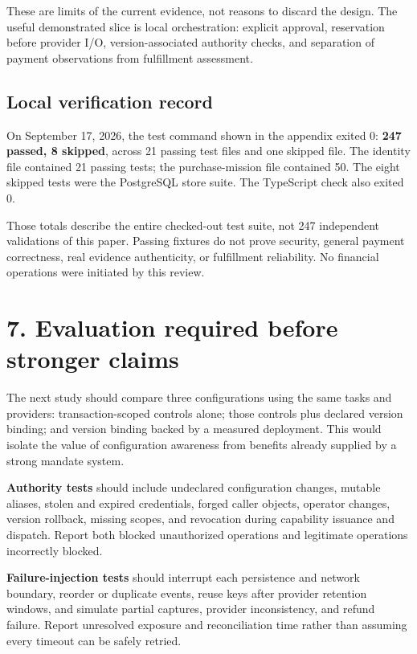 \documentclass[
  11pt,
  letterpaper,
]{article}
\begin{document}
These are limits of the current evidence, not reasons to discard the
design. The useful demonstrated slice is local orchestration: explicit
approval, reservation before provider I/O, version-associated authority
checks, and separation of payment observations from fulfillment
assessment.

\subsection{Local verification record}\label{local-verification-record}

On September 17, 2026, the test command shown in the appendix exited 0:
\textbf{247 passed, 8 skipped}, across 21 passing test files and one
skipped file. The identity file contained 21 passing tests; the
purchase-mission file contained 50. The eight skipped tests were the
PostgreSQL store suite. The TypeScript check also exited 0.

Those totals describe the entire checked-out test suite, not 247
independent validations of this paper. Passing fixtures do not prove
security, general payment correctness, real evidence authenticity, or
fulfillment reliability. No financial operations were initiated by this
review.

\section{7. Evaluation required before stronger
claims}\label{evaluation-required-before-stronger-claims}

The next study should compare three configurations using the same tasks
and providers: transaction-scoped controls alone; those controls plus
declared version binding; and version binding backed by a measured
deployment. This would isolate the value of configuration awareness from
benefits already supplied by a strong mandate system.

\textbf{Authority tests} should include undeclared configuration
changes, mutable aliases, stolen and expired credentials, forged caller
objects, operator changes, version rollback, missing scopes, and
revocation during capability issuance and dispatch. Report both blocked
unauthorized operations and legitimate operations incorrectly blocked.

\textbf{Failure-injection tests} should interrupt each persistence and
network boundary, reorder or duplicate events, reuse keys after provider
retention windows, and simulate partial captures, provider
inconsistency, and refund failure. Report unresolved exposure and
reconciliation time rather than assuming every timeout can be safely
retried.
\end{document}
